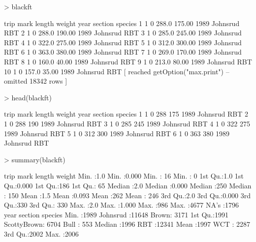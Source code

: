 \documentclass[12pt]{article}
\begin{document}
\begin{enumerate}
\begin{Schunk}
\begin{Sinput}
> blackft
\end{Sinput}
\begin{Soutput}
      trip mark length  weight year     section species
1        1    0  288.0  175.00 1989    Johnsrud     RBT
2        1    0  288.0  190.00 1989    Johnsrud     RBT
3        1    0  285.0  245.00 1989    Johnsrud     RBT
4        1    0  322.0  275.00 1989    Johnsrud     RBT
5        1    0  312.0  300.00 1989    Johnsrud     RBT
6        1    0  363.0  380.00 1989    Johnsrud     RBT
7        1    0  269.0  170.00 1989    Johnsrud     RBT
8        1    0  160.0   40.00 1989    Johnsrud     RBT
9        1    0  213.0   80.00 1989    Johnsrud     RBT
10       1    0  157.0   35.00 1989    Johnsrud     RBT
 [ reached getOption("max.print") -- omitted 18342 rows ]
\end{Soutput}
\begin{Sinput}
> head(blackft)
\end{Sinput}
\begin{Soutput}
  trip mark length weight year  section species
1    1    0    288    175 1989 Johnsrud     RBT
2    1    0    288    190 1989 Johnsrud     RBT
3    1    0    285    245 1989 Johnsrud     RBT
4    1    0    322    275 1989 Johnsrud     RBT
5    1    0    312    300 1989 Johnsrud     RBT
6    1    0    363    380 1989 Johnsrud     RBT
\end{Soutput}
\begin{Sinput}
> summary(blackft)
\end{Sinput}
\begin{Soutput}
      trip          mark           length        weight    
 Min.   :1.0   Min.   :0.000   Min.   : 16   Min.   :   0  
 1st Qu.:1.0   1st Qu.:0.000   1st Qu.:186   1st Qu.:  65  
 Median :2.0   Median :0.000   Median :250   Median : 150  
 Mean   :1.5   Mean   :0.093   Mean   :262   Mean   : 246  
 3rd Qu.:2.0   3rd Qu.:0.000   3rd Qu.:330   3rd Qu.: 330  
 Max.   :2.0   Max.   :1.000   Max.   :986   Max.   :4677  
                                             NA's   :1796  
      year             section       species     
 Min.   :1989   Johnsrud   :11648   Brown: 3171  
 1st Qu.:1991   ScottyBrown: 6704   Bull :  553  
 Median :1996                       RBT  :12341  
 Mean   :1997                       WCT  : 2287  
 3rd Qu.:2002                                    
 Max.   :2006                                    
\end{Soutput}
\end{Schunk}


\end{enumerate}
\end{document}
